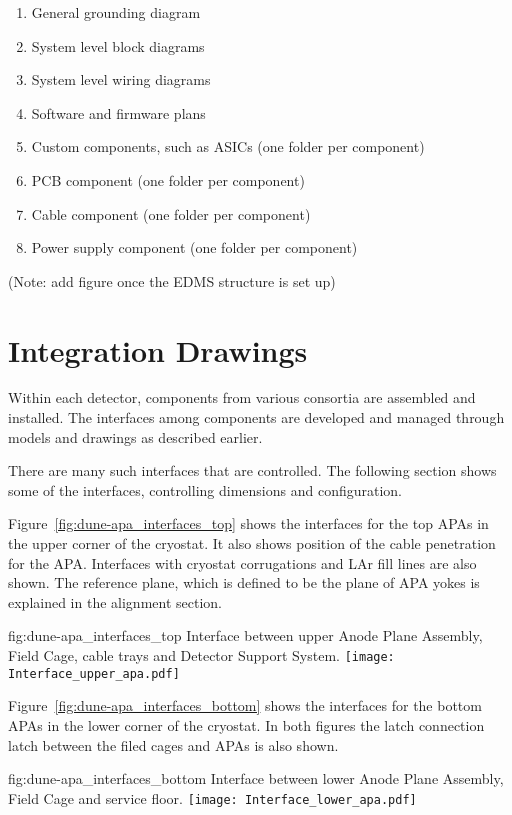 \begin{enumerate}
\begin{enumerate}
   \item General grounding diagram
   \item System level block diagrams
   \item System level wiring diagrams
   \item Software and firmware plans
   \item Custom components, such as ASICs (one folder per component)
   \item PCB component (one folder per component)
   \item Cable component (one folder per component)
   \item Power supply component (one folder per component)
 \end{enumerate}
\end{enumerate}
(Note: add figure once the EDMS structure is set up)



\section{Integration Drawings}
\label{sec:fdsp-coord-integ-drawings}
Within each detector, components from various consortia are assembled
and installed. The interfaces among components are developed and
managed through models and drawings as described earlier.

There are many such interfaces that are controlled. The following
section shows some of the interfaces, controlling dimensions and
configuration.

Figure~\ref{fig:dune-apa_interfaces_top} shows the interfaces for the
top APAs in the upper corner of the cryostat. It also shows position
of the cable penetration for the APA. Interfaces with cryostat
corrugations and LAr fill lines are also shown. The reference plane,
which is defined to be the plane of APA yokes is explained in the
alignment section.
\begin{dunefigure}{fig:dune-apa_interfaces_top}
  {Interface between upper Anode Plane Assembly, Field Cage, cable
    trays and Detector Support System.}
  \texttt{[image: Interface\_upper\_apa.pdf]}
\end{dunefigure}

Figure~\ref{fig:dune-apa_interfaces_bottom} shows the interfaces for
the bottom APAs in the lower corner of the cryostat. In both figures
the latch connection latch between the filed cages and APAs is also
shown.
\begin{dunefigure}{fig:dune-apa_interfaces_bottom}
  {Interface between lower Anode Plane Assembly, Field Cage and
    service floor.}
  \texttt{[image: Interface\_lower\_apa.pdf]}
\end{dunefigure}

